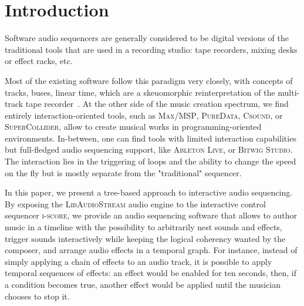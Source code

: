 \documentclass{article}
\title{\papertitle}
\newcommand*{\LibAudioStream}{\textsc{LibAudioStream}\xspace}
\newcommand*{\iscore}{\textsc{i-score}\xspace}
\newcommand*{\maxmsp}{\textsc{Max/MSP}\xspace}
\newcommand*{\puredata}{\textsc{PureData}\xspace}
\newcommand*{\csound}{\textsc{Csound}\xspace}
\newcommand*{\supercollider}{\textsc{SuperCollider}\xspace}
\newcommand*{\abletonlive}{\textsc{Ableton Live}\xspace}
\newcommand*{\bitwigstudio}{\textsc{Bitwig Studio}\xspace}
\begin{document}
\capstartfalse
\maketitle
\capstarttrue

\begin{abstract}
The field of digital music authoring provides a wealth of creative environments in which music can be created and authored: patchers, programming languages, and multitrack sequencers.
By combining the \iscore interactive sequencer to the \LibAudioStream audio engine, a new music software able to represent and play rich interactive audio sequences is introduced.
We present new stream expressions compatible with the \LibAudioStream, and 
use them to create an interactive audio graph: hierarchical stream and send - return streams.
This allows to create branching and arbitrarily nested musical scores, in an OSC-centric environment.
Three examples of interactive musical scores are presented: the recreation of a traditional multi-track sequencer, an interactive musical score, and a temporal effect graph.
\end{abstract}

\section{Introduction}
Software audio sequencers are generally considered to be digital versions 
of the traditional tools that are used in a recording studio: tape recorders, 
mixing desks or effect racks, etc.

Most of the existing software follow this paradigm very closely, with 
concepts of tracks, buses, linear time, which are a skeuomorphic reinterpretation of the multi-track tape recorder~\cite{bell2015skeuomorphism}.
At the other side of the music creation spectrum, we find entirely interaction-oriented tools, 
such as \maxmsp, \puredata, \csound, or \supercollider, allow to create musical works in programming-oriented 
environments.
In-between, one can find tools with limited interaction capabilities but full-fledged audio sequencing support, 
like \abletonlive, or \bitwigstudio.
The interaction lies in the triggering of loops and the ability to change the speed on the fly but is mostly separate from the "traditional" sequencer.

In this paper, we present a tree-based approach to interactive audio sequencing.
By exposing the \LibAudioStream audio engine to the interactive control sequencer \iscore, 
we provide an audio sequencing software that allows to author music in a timeline 
with the possibility to arbitrarily nest sounds and effects, trigger sounds interactively 
while keeping the logical coherency wanted by the composer, and arrange audio effects in a temporal graph.
For instance, instead of simply applying a chain of effects to an audio track, it is possible to apply temporal sequences of effects: an effect would be enabled for ten seconds, then, if a condition becomes true, another effect would be applied until the musician chooses to stop it.
\end{document}
